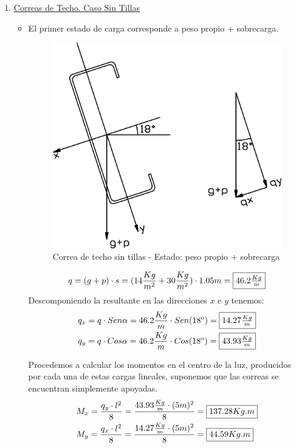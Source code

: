 \begin{enumerate}
\item \underline{Correas de Techo. Caso Sin Tillas}\\
\begin{itemize}
\item El primer estado de carga corresponde a peso propio + sobrecarga.

\begin{figure}[H]
\begin{center}
     \includegraphics[scale = 1]{chapters/chapter_1/images/figura1.png}
\caption{Correa de techo sin tillas - Estado: peso propio + sobrecarga}
\end{center}
\end{figure}

$$q= (g+p)\cdot s = (14 \frac{Kg}{m^2}+30 \frac{Kg}{m^2}) \cdot 1.05m = \framebox{$46.2 \frac{Kg}{m}$}$$
Descomponiendo la resultante en las direcciones $x$ e $y$ tenemos:
\begin{align*}
& q_x=q \cdot Sen \alpha= 46.2 \frac{Kg}{m} \cdot Sen(18\textsuperscript{o})= \framebox{$14.27 \frac{Kg}{m}$}\\
& q_y=q \cdot Cos \alpha= 46.2 \frac{Kg}{m} \cdot Cos(18\textsuperscript{o})= \framebox{$43.93 \frac{Kg}{m}$}
\end{align*}

Procedemos a calcular los momentos en el centro de la luz, producidos por cada una de estas cargas lineales, suponemos que las correas se encuentran simplemente apoyadas.
\begin{align*}
& M_x= \frac{q_y \cdot l^2}{8} = \frac{43.93 \frac{Kg}{m} \cdot (5m)^2}{8} = \framebox{$137.28 Kg.m$} \\
& M_y= \frac{q_x \cdot l^2}{8} = \frac{14.27 \frac{Kg}{m} \cdot (5m)^2}{8} = \framebox{$44.59 Kg.m$}
\end{align*}


\end{itemize}
\end{enumerate}
